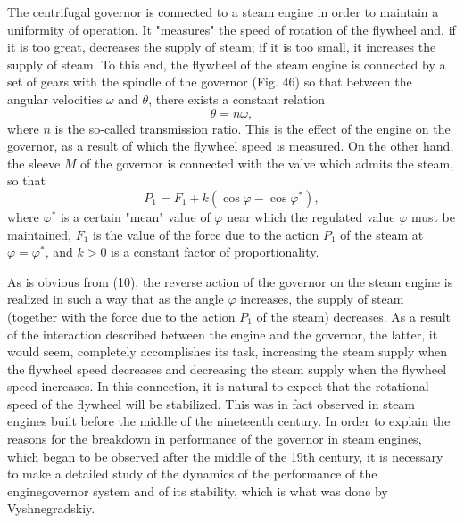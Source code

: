 \documentclass[10pt,a5paper]{book}
\theoremstyle{plain}
\theoremstyle{definition}
\theoremstyle{remark}
\begin{document}
The centrifugal governor is connected to a steam engine in order to maintain a uniformity of operation. It "measures" the speed of rotation of the flywheel and, if it is too great, decreases the supply of steam; if it is too small, it increases the supply of steam. To this end, the flywheel of the steam engine is connected by a set of gears with the spindle of the governor (Fig. 46) so that between the angular velocities $\omega$ and $\theta$, there exists a constant relation
\begin{equation*}
\theta=n \omega, \tag{9}
\end{equation*}
where $n$ is the so-called transmission ratio. This is the effect of the engine on the governor, as a result of which the flywheel speed is measured. On the other hand, the sleeve $M$ of the governor is connected with the valve which admits the steam, so that
\begin{equation*}
P_{1}=F_{1}+k\left(\cos \varphi-\cos \varphi^{*}\right), \tag{10}
\end{equation*}
where $\varphi^{*}$ is a certain "mean" value of $\varphi$ near which the regulated value $\varphi$ must be maintained, $F_{1}$ is the value of the force due to the action $P_{1}$ of the steam at $\varphi=\varphi^{*}$, and $k>0$ is a constant factor of proportionality.

As is obvious from (10), the reverse action of the governor on the steam engine is realized in such a way that as the angle $\varphi$ increases, the supply of steam (together with the force due to the action $P_{1}$ of the steam) decreases. As a result of the interaction described between the engine and the governor, the latter, it would seem, completely accomplishes its task, increasing the steam supply when the flywheel speed decreases and decreasing the steam supply when the flywheel speed increases. In this connection, it is natural to expect that the rotational speed of the flywheel will be stabilized. This was in fact observed in steam engines built before the middle of the nineteenth century. In order to explain the reasons for the breakdown in performance of the governor in steam engines, which began to be observed after the middle of the 19th century, it is necessary to make a detailed study of the dynamics of the performance of the enginegovernor system and of its stability, which is what was done by Vyshnegradskiy.
\end{document}
